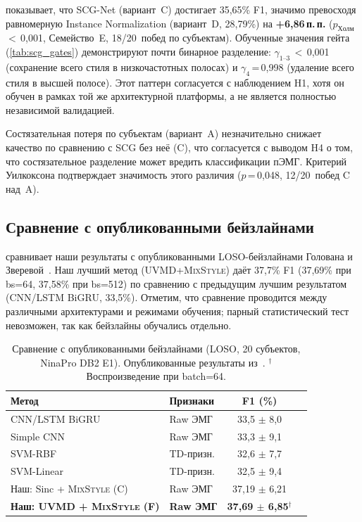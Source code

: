 \documentclass[conference]{IEEEtran}
\newcommand{\pp}{\,п.\,п.}
\newcommand{\mixstyle}{\textsc{MixStyle}}
\newcommand{\uvmd}{\textsc{UVMD}}
\begin{document}
 показывает, что SCG-Net (вариант~C) достигает 35,65\% F1, значимо превосходя равномерную Instance Normalization (вариант~D, 28,79\%) на \textbf{+6,86\pp{}} ($p_{\mathrm{Холм}}$\,$<$\,0,001, Семейство~E, 18/20~побед по субъектам).
Обученные значения гейта (\cref{tab:scg_gates}) демонстрируют почти бинарное разделение: $\gamma_{1\text{--}3}$\,$<$\,0,001 (сохранение всего стиля в низкочастотных полосах) и $\gamma_4$\,=\,0,998 (удаление всего стиля в высшей полосе).
Этот паттерн согласуется с наблюдением H1, хотя он обучен в рамках той же архитектурной платформы, а не является полностью независимой валидацией.

Состязательная потеря по субъектам (вариант~A) незначительно снижает качество по сравнению с SCG без неё (C), что согласуется с выводом H4 о том, что состязательное разделение может вредить классификации пЭМГ.
Критерий Уилкоксона подтверждает значимость этого различия ($p$\,=\,0,048, 12/20~побед C над~A).

\subsection{Сравнение с опубликованными бейзлайнами}

 сравнивает наши результаты с опубликованными LOSO-бейзлайнами Голована и Зверевой~\cite{golovan2025benchmark}.
Наш лучший метод (\uvmd{}+\mixstyle{}) даёт 37,7\% F1 (37,69\% при bs=64, 37,58\% при bs=512) по сравнению с предыдущим лучшим результатом (CNN/LSTM BiGRU, 33,5\%).
Отметим, что сравнение проводится между различными архитектурами и режимами обучения; парный статистический тест невозможен, так как бейзлайны обучались отдельно.

\begin{table}[t]
\centering
\caption{Сравнение с опубликованными бейзлайнами (LOSO, 20 субъектов, NinaPro DB2 E1). Опубликованные результаты из~\cite{golovan2025benchmark}. $^\dagger$Воспроизведение при batch=64.}
\label{tab:benchmark}
\begin{tabular}{llcc}
\toprule
Метод & Признаки & F1 (\%) \\
\midrule
CNN/LSTM BiGRU~\cite{golovan2025benchmark} & Raw ЭМГ & 33,5 $\pm$ 8,0 \\
Simple CNN~\cite{golovan2025benchmark} & Raw ЭМГ & 33,3 $\pm$ 9,1 \\
SVM-RBF~\cite{golovan2025benchmark} & TD-призн. & 32,6 $\pm$ 7,7 \\
SVM-Linear~\cite{golovan2025benchmark} & TD-призн. & 32,5 $\pm$ 9,4 \\
\midrule
Наш: Sinc + \mixstyle{} (C) & Raw ЭМГ & 37,19 $\pm$ 6,21 \\
\textbf{Наш: \uvmd{} + \mixstyle{} (F)} & \textbf{Raw ЭМГ} & \textbf{37,69 $\pm$ 6,85}$^\dagger$ \\
\bottomrule
\end{tabular}
\end{table}
\end{document}
